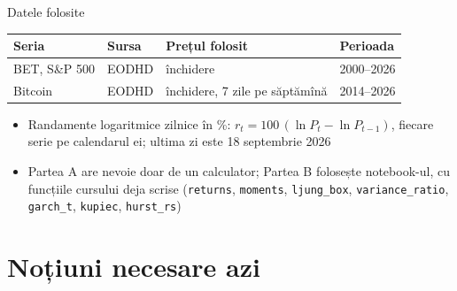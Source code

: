 \begin{frame}{Datele folosite}
\itemsize{\small}
\begin{center}
\footnotesize
\begin{tabular}{llll}
\toprule
\textbf{Seria} & \textbf{Sursa} & \textbf{Prețul folosit} & \textbf{Perioada} \\
\midrule
BET, S\&P 500 & EODHD & închidere & 2000--2026 \\
Bitcoin & EODHD & închidere, 7 zile pe săptămînă & 2014--2026 \\
\bottomrule
\end{tabular}
\end{center}
\begin{itemize}
    \item Randamente logaritmice zilnice în \%: $r_t = 100\,(\ln P_t - \ln P_{t-1})$, fiecare serie pe calendarul ei; ultima zi este 18 septembrie 2026
    \item Partea A are nevoie doar de un calculator; Partea B folosește notebook-ul, cu funcțiile cursului deja scrise (\texttt{returns}, \texttt{moments}, \texttt{ljung\_box}, \texttt{variance\_ratio}, \texttt{garch\_t}, \texttt{kupiec}, \texttt{hurst\_rs})
\end{itemize}
\end{frame}


\section{Noțiuni necesare azi}

